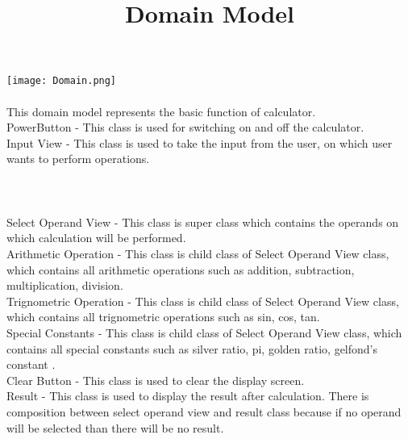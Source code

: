 \documentclass[12pt]{article}
\begin{document}
\title{Domain Model}
\date{\vspace{-5ex}}
\maketitle

\texttt{[image: Domain.png]}\\\\

This domain model represents the basic function of calculator.\\
PowerButton - This class is used for switching on and off the calculator.\\
Input View - This class is used to take the input from the user, on which user wants to perform operations.\\
\\\\\\
Select Operand View - This class is super class which contains the operands on which calculation will be performed.\\
Arithmetic Operation - This class is child class of Select Operand View class, which contains all arithmetic operations such as addition, subtraction, multiplication, division.\\
Trignometric Operation - This class is child class of Select Operand View class, which contains all trignometric operations such as sin, cos, tan.\\
Special Constants - This class is child class of Select Operand View class, which contains all special constants such as silver ratio, pi, golden ratio, gelfond's constant .\\
Clear Button - This class is used to clear the display screen.\\
Result - This class is used to display the result after calculation. There is composition between select operand view and result class because if no operand will be selected than there will be no result.\\
\end{document}

